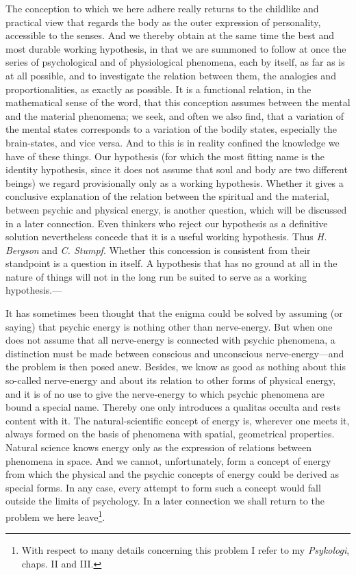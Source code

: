 \documentclass[12pt,a4paper]{book}
\newcommand{\opage}[1]{\marginnote{\footnotesize\textit{[#1]}}}
\begin{document}
The conception to which we here adhere really returns to the childlike
and practical view that regards the body as the outer expression of
personality, accessible to the senses. And we thereby obtain at the same
time the best and most durable working hypothesis, in that we are
summoned to follow at once the series of psychological and of
physiological phenomena, each by itself, as far as is at all possible,
and to investigate the relation between them, the analogies and
proportionalities, as exactly as possible. It is a functional relation,
in the mathematical sense of the word, that this conception assumes
between the mental and the material phenomena; \opage{33}we seek, and often we
also find, that a variation of the mental states corresponds to a
variation of the bodily states, especially the brain-states, and vice
versa. And to this is in reality confined the knowledge we have of these
things. Our hypothesis (for which the most fitting name is the identity
hypothesis, since it does not assume that soul and body are two
different beings) we regard provisionally only as a working hypothesis.
Whether it gives a conclusive explanation of the relation between the
spiritual and the material, between psychic and physical energy, is
another question, which will be discussed in a later connection. Even
thinkers who reject our hypothesis as a definitive solution nevertheless
concede that it is a useful working hypothesis. Thus \emph{H. Bergson}
and \emph{C. Stumpf}. Whether this concession is consistent from their
standpoint is a question in itself. A hypothesis that has no ground at
all in the nature of things will not in the long run be suited to serve
as a working hypothesis.---

It has sometimes been thought that the enigma could be solved by
assuming (or saying) that psychic energy is nothing other than
nerve-energy. But when one does not assume that all nerve-energy is
connected with psychic phenomena, a distinction must be made between
conscious and unconscious nerve-energy---and the problem is then posed
anew. Besides, we know as good as nothing about this so-called
nerve-energy and about its relation to other forms of physical energy,
and it is of no use to give the nerve-energy to which psychic phenomena
are bound a special name. Thereby one only introduces a qualitas occulta
and rests content with it. The natural-scientific concept of energy is,
wherever one meets it, always formed on the basis of phenomena with
spatial, geometrical properties. Natural science knows energy only as
the expression of relations between phenomena in space. And we cannot,
unfortunately, form a concept of energy from which the physical and the
psychic concepts of energy could be derived as special forms. In any
case, every attempt to form such a concept would fall outside the \opage{34}limits
of psychology. In a later connection we shall return to the problem we
here leave\footnote{With respect to many details concerning this problem
I refer to my \emph{Psykologi}, chaps. II and III.}.
\end{document}
